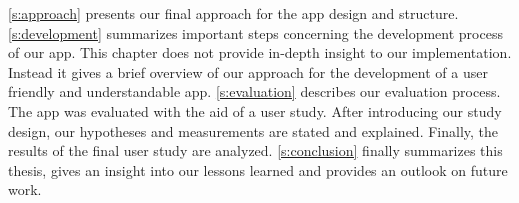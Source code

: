 \newline
\newline
\autoref{s:approach} presents our final approach for the app design and structure.
\newline
\newline
\autoref{s:development} summarizes important steps concerning the development process of our app.
This chapter does not provide in-depth insight to our implementation.
Instead it gives a brief overview of our approach for the development of a user friendly and understandable app.
\newline
\newline
\autoref{s:evaluation} describes our evaluation process.
 The app was evaluated with the aid of a user study.
 After introducing our study design, our hypotheses and measurements are stated and explained.
Finally, the results of the final user study are analyzed.
\newline
\newline
\autoref{s:conclusion} finally summarizes this thesis, gives an insight into our lessons learned and provides an outlook on future work.



